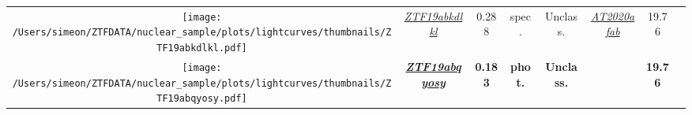 \begin{table*}[t!]
{\begin{tabular}{c  c  c  c  c  c  c  c}
      \parbox[c]{12em}{\texttt{[image: /Users/simeon/ZTFDATA/nuclear\_sample/plots/lightcurves/thumbnails/ZTF19abkdlkl.pdf]}} & \textit{\href{https://ztfnuclear.simeonreusch.com/transient/ZTF19abkdlkl}{ZTF19abkdlkl}}          & 0.288          & spec.              & Unclass.                & \textit{\href{https://www.wis-tns.org/object/2020afab}{AT2020afab}} & 19.76                      & \cite{Velzen2021}                  \\
      \parbox[c]{12em}{\texttt{[image: /Users/simeon/ZTFDATA/nuclear\_sample/plots/lightcurves/thumbnails/ZTF19abqyosy.pdf]}} & \textbf{\textit{\href{https://ztfnuclear.simeonreusch.com/transient/ZTF19abqyosy}{ZTF19abqyosy}}} & \textbf{0.183} & \textbf{phot.}     & \textbf{Unclass.}       &                                                                     & \textbf{19.76}             &                                    \\
    \end{tabular}}
\end{table*}


